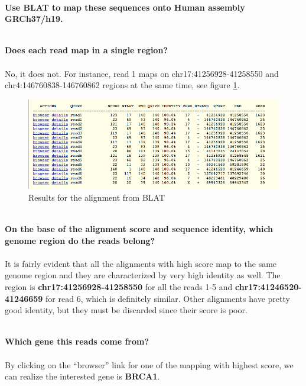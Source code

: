 \documentclass[12pt, a4paper]{article}
\begin{document}
\textbf{\\ Use BLAT to map these sequences onto Human assembly GRCh37/h19.}%

\textbf{\\Does each read map in a single region?}%

\paragraph{}No, it does not. For instance, read 1 maps on chr17:41256928-41258550 and chr4:146760838-146760862 regions at the same time, see figure \ref{BLAT results}.%

\begin{figure}[h]
	\centering
	\includegraphics[width = \textwidth]{BLAT_results}
	\caption{Results for the alignment from BLAT}
	\label{BLAT results}
\end{figure}

\textbf{\\ On the base of the alignment score and sequence identity, which genome region do the reads belong?}%

\paragraph{}It is fairly evident that all the alignments with high score map to the same genome region and they are characterized by very high identity as well. The region is \textbf{chr17:41256928-41258550} for all the reads 1-5 and \textbf{chr17:41246520-41246659} for read 6, which is definitely similar. Other alignments have pretty good identity, but they must be discarded since their score is poor.

\textbf{\\ Which gene this reads come from?}%
\paragraph{}By clicking on the “browser” link for one of the mapping with highest score, we can realize the interested gene is \textbf{BRCA1}.
\end{document}
